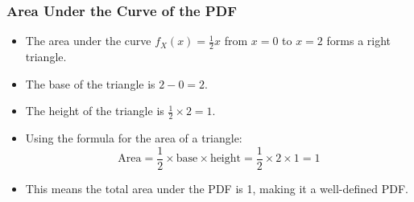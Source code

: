 \documentclass[handout]{beamer} %
\begin{document}
\begin{frame}
\frametitle{Area Under the Curve of the PDF}
    \begin{itemize}
        \item The area under the curve \(f_X(x) = \frac{1}{2}x\) from \(x=0\) to \(x=2\) forms a right triangle.
        \item The base of the triangle is \(2-0 = 2\).
        \item The height of the triangle is \(\frac{1}{2} \times 2 = 1\). \pause
        \item Using the formula for the area of a triangle: \pause
        \[
        \text{Area} = \frac{1}{2} \times \text{base} \times \text{height} = \frac{1}{2} \times 2 \times 1 = 1
        \] \pause
        \item This means the total area under the PDF is 1, making it a well-defined PDF.
    \end{itemize}
\end{frame}
\end{document}
